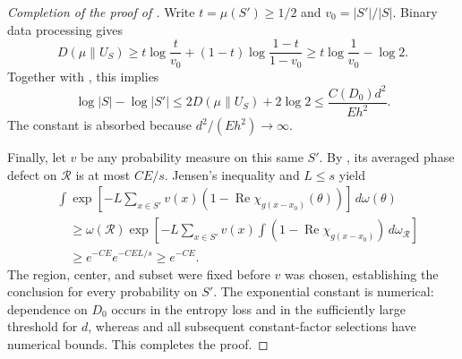 \begin{proof}[Completion of the proof of ]
Write $t=\mu(S')\ge1/2$ and $v_0=|S'|/|S|$. Binary data processing gives
\[
 D(\mu\|U_S)\ge
 t\log\frac t{v_0}+(1-t)\log\frac{1-t}{1-v_0}
 \ge t\log\frac1{v_0}-\log2.
\]
Together with , this implies
\[
 \log|S|-\log|S'|\le2D(\mu\|U_S)+2\log2
 \le\frac{C(D_0)d^2}{Eh^2}.
\]
The constant is absorbed because $d^2/(Eh^2)\to\infty$.

Finally, let $v$ be any probability measure on this same $S'$.
By , its averaged phase defect on
$\mathcal R$ is at most $CE/s$. Jensen's inequality and $L\le s$ yield
\[
 \begin{split}
 &\int\exp\left[-L\sum_{x\in S'}v(x)
       (1-\operatorname{Re}\chi_{g(x-x_0)}(\theta))\right]\,d\omega(\theta)\\
 &\quad\ge\omega(\mathcal R)
   \exp\left[-L\sum_{x\in S'}v(x)
       \int(1-\operatorname{Re}\chi_{g(x-x_0)})\,d\omega_{\mathcal R}\right]\\
 &\quad\ge e^{-CE}e^{-CEL/s}\ge e^{-CE}.
 \end{split}
\]
The region, center, and subset were fixed before $v$ was chosen, establishing
the conclusion for every probability on $S'$.
The exponential constant is numerical: dependence on $D_0$ occurs in the
entropy loss and in the sufficiently large threshold for $d$, whereas
 and all subsequent constant-factor
selections have numerical bounds. This completes the proof.
\end{proof}

